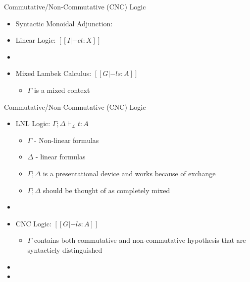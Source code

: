 \documentclass{beamer}
\begin{document}
\begin{frame}{Commutative/Non-Commutative (CNC) Logic}

\begin{itemize}
\item Syntactic Monoidal Adjunction:
  
  \begin{center}
  \end{center}

\item Linear Logic: $[[I |-c t : X]]$
\item[]
\item Mixed Lambek Calculus: $[[G |-l s : A]]$
  \begin{itemize}
  \item $\Gamma$ is a mixed context
  \end{itemize}
\end{itemize}
\end{frame}

\begin{frame}{Commutative/Non-Commutative (CNC) Logic}
  \begin{itemize}
  \item LNL Logic: $\Gamma;\Delta \vdash_{\mathcal{L}} t : A$
    \begin{itemize}
    \item $\Gamma$ - Non-linear formulas
    \item $\Delta$ - linear formulas
    \item $\Gamma;\Delta$ is a presentational device and works because of exchange
    \item $\Gamma;\Delta$ should be thought of as completely mixed
    \end{itemize}
  \item[]
  \item CNC Logic: $[[G |-l s : A]]$
    \begin{itemize}
    \item $\Gamma$ contains both commutative and non-commutative hypothesis that are syntacticly distinguished
    \end{itemize}
  \item[]
  \item[]
  \end{itemize}
\end{frame}
\end{document}
